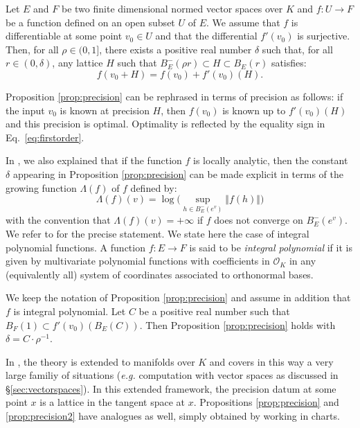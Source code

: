 \documentclass{sig-alternate}
\renewcommand{\O}{\mathcal O}
\begin{document}
\begin{prop}
\label{prop:precision}
Let $E$ and $F$ be two finite dimensional normed vector spaces over $K$ 
and $f : U \rightarrow F$ be a function defined on an open subset $U$ of 
$E$. We assume that $f$ is differentiable at some point $v_0 \in U$ and 
that the differential $f'(v_0)$ is surjective.
Then, for all $\rho \in (0, 1]$, there exists a positive real
number $\delta$ such that, for all $r \in (0, \delta)$, any lattice
$H$ such that $B^-_E(\rho r) \subset H \subset B^{\phantom -}_E(r)$ 
satisfies:
\begin{equation}
\label{eq:firstorder}
f(v_0 + H) = f(v_0) + f'(v_0) (H).
\end{equation}
\end{prop}

Proposition \ref{prop:precision} can be rephrased in terms of precision 
as follows: if the input $v_0$ is known at precision $H$, then $f(v_0)$ 
is known up to $f'(v_0)(H)$ and this precision is optimal. Optimality is 
reflected by the equality sign in Eq.~\eqref{eq:firstorder}.

In \cite{caruso-roe-vaccon:14a}, we also explained that if the function 
$f$ is locally analytic, then the constant $\delta$ appearing in
Proposition \ref{prop:precision} can be made explicit in terms of the
growing function $\Lambda(f)$ of $f$ defined by:
$$\textstyle \Lambda(f)(v) = 
\log \big( \sup_{h \in B^-_E(e^v)} \Vert 
f(h) \Vert \big)$$
with the convention that $\Lambda(f)(v) = +\infty$ if $f$ does not
converge on $B^-_E(e^v)$.
We refer to \cite[Proposition 3.12]{caruso-roe-vaccon:14a} for the
precise statement.  We state here the case of
integral polynomial functions. A function $f : E \to F$ is said to be
\emph{integral polynomial} if it is given by multivariate polynomial 
functions with coefficients in $\O_K$ in any (equivalently all) system 
of coordinates associated to orthonormal bases.

\begin{prop}
\label{prop:precision2}
We keep the notation of Proposition \ref{prop:precision} and assume 
in addition that $f$ is integral polynomial. Let $C$ be a positive real
number such that $B_F(1) \subset f'(v_0)(B_E(C))$. 
Then Proposition \ref{prop:precision} holds with $\delta = C \cdot
\rho^{-1}$.
\end{prop}

In \cite[Appendix A]{caruso-roe-vaccon:14a}, the theory is extended 
to manifolds over $K$ and covers in this way a very large familiy of
situations (\emph{e.g.} computation with vector spaces as discussed
in \S \ref{sec:vectorspaces}). In this extended framework, the precision 
datum at some point $x$ is a lattice in the tangent space at $x$. 
Propositions \ref{prop:precision} and \ref{prop:precision2} have
analogues as well, simply obtained by working in charts.
\end{document}
